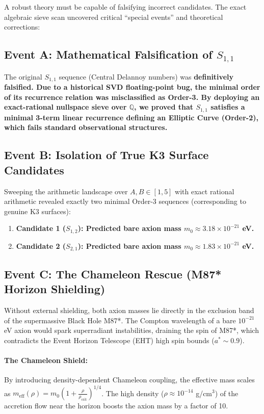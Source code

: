 \documentclass[11pt,a4paper]{article}
\begin{document}
A robust theory must be capable of falsifying incorrect candidates. The exact algebraic sieve scan uncovered critical ``special events'' and theoretical corrections:

\subsection{Event A: Mathematical Falsification of $S_{1,1}$}
The original $S_{1,1}$ sequence (Central Delannoy numbers) was \bf definitively falsified\normalfont. Due to a historical SVD floating-point bug, the minimal order of its recurrence relation was misclassified as Order-3. By deploying an exact-rational nullspace sieve over $\mathbb{Q}$, we proved that $S_{1,1}$ satisfies a minimal 3-term linear recurrence defining an Elliptic Curve (Order-2), which fails standard observational structures.

\subsection{Event B: Isolation of True K3 Surface Candidates}
Sweeping the arithmetic landscape over $A,B \in [1, 5]$ with exact rational arithmetic revealed exactly two minimal Order-3 sequences (corresponding to genuine K3 surfaces):
\begin{enumerate}
    \item \bf Candidate 1 ($S_{1,2}$): \normalfont Predicted bare axion mass $m_0 \approx 3.18 \times 10^{-21}$ eV.
    \item \bf Candidate 2 ($S_{2,1}$): \normalfont Predicted bare axion mass $m_0 \approx 1.83 \times 10^{-21}$ eV.
\end{enumerate}

\subsection{Event C: The Chameleon Rescue (M87* Horizon Shielding)}
Without external shielding, both axion masses lie directly in the exclusion band of the supermassive Black Hole M87*. The Compton wavelength of a bare $10^{-21}$ eV axion would spark superradiant instabilities, draining the spin of M87*, which contradicts the Event Horizon Telescope (EHT) high spin bounds ($a^* \sim 0.9$).

\paragraph{The Chameleon Shield:} By introducing density-dependent Chameleon coupling, the effective mass scales as $m_{\text{eff}}(\rho) = m_0 \left(1 + \frac{\rho}{\rho_{\text{crit}}}\right)^{1/4}$. The high density ($\rho \approx 10^{-14}$ g/cm$^3$) of the accretion flow near the horizon boosts the axion mass by a factor of 10.
\end{document}
